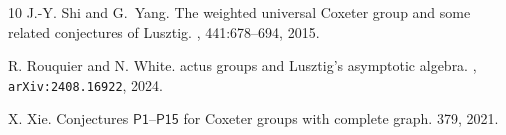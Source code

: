 \documentclass[11pt]{article}
\theoremstyle{plain}
\theoremstyle{definition}
\numberwithin{equation}{section}
\begin{document}
\begin{thebibliography}{10}
J.-Y. Shi and G.~{Y}ang.
\newblock The weighted universal {C}oxeter group and some related conjectures of {L}usztig.
, 441:678--694, 2015.




R. Rouquier and N. White.
actus groups and {L}usztig's asymptotic algebra.
, \texttt{arXiv:2408.16922}, 2024. 

X. Xie. 
\newblock Conjectures $\mathsf{P1}$--$\mathsf{P15}$ for Coxeter groups with complete graph. 
 379, 2021. 

%

%
%
%
%
%
%
%
%

%
%

%  
%  
%
%
%  
%
%
%
%
%


\end{thebibliography}
\end{document}
